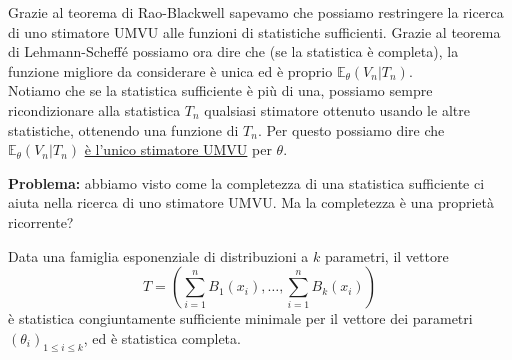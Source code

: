 \begin{oss}[importante]
Grazie al teorema di Rao-Blackwell sapevamo che possiamo restringere la ricerca di uno stimatore UMVU alle funzioni di statistiche sufficienti. Grazie al teorema di Lehmann-Scheffé possiamo ora dire che (se la statistica è completa), la funzione migliore da considerare è unica ed è proprio $\mathbb{E}_{\theta}(V_n|T_n)$.\\
Notiamo che se la statistica sufficiente è più di una, possiamo sempre ricondizionare alla statistica $T_n$ qualsiasi stimatore ottenuto usando le altre statistiche, ottenendo una funzione di $T_n$. Per questo possiamo dire che $\mathbb{E}_{\theta}(V_n|T_n)$ \underline{è l'unico stimatore UMVU} per $\theta$.
\end{oss}

\textbf{Problema:} abbiamo visto come la completezza di una statistica sufficiente ci aiuta nella ricerca di uno stimatore UMVU. Ma la completezza è una proprietà ricorrente?

\begin{thm}
Data una famiglia esponenziale di distribuzioni a \(k\) parametri, il vettore
\begin{equation}
  T = \left(\sum_{i=1}^n B_1(x_i),\dotsc,\sum_{i=1}^n B_k(x_i)\right)
\end{equation}
è statistica congiuntamente sufficiente minimale per il vettore dei parametri \({(\theta_i)}_{1 \le i \le k}\), ed è statistica completa.
\end{thm}

